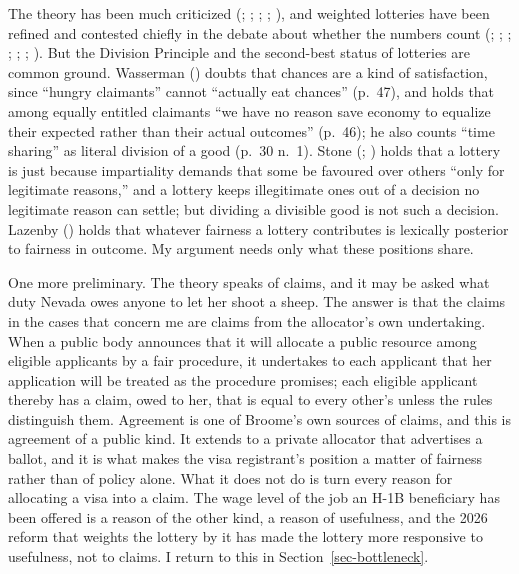 \documentclass[
  11pt,
  letterpaper,
  DIV=11,
  numbers=noendperiod,
  twoside]{scrartcl}
\begin{document}
The theory has been much criticized (; ;
;
;
), and weighted lotteries have
been refined and contested chiefly in the debate about whether the
numbers count (;
;
;
;
; ; ). But the Division Principle and the second-best status of
lotteries are common ground. Wasserman
() doubts that chances are a kind of
satisfaction, since ``hungry claimants'' cannot ``actually eat chances''
(p.~47), and holds that among equally entitled claimants ``we have no
reason save economy to equalize their expected rather than their actual
outcomes'' (p.~46); he also counts ``time sharing'' as literal division
of a good (p.~30 n.~1). Stone (;
) holds that a lottery is just because
impartiality demands that some be favoured over others ``only for
legitimate reasons,'' and a lottery keeps illegitimate ones out of a
decision no legitimate reason can settle; but dividing a divisible good
is not such a decision. Lazenby ()
holds that whatever fairness a lottery contributes is lexically
posterior to fairness in outcome. My argument needs only what these
positions share.

One more preliminary. The theory speaks of claims, and it may be asked
what duty Nevada owes anyone to let her shoot a sheep. The answer is
that the claims in the cases that concern me are claims from the
allocator's own undertaking. When a public body announces that it will
allocate a public resource among eligible applicants by a fair
procedure, it undertakes to each applicant that her application will be
treated as the procedure promises; each eligible applicant thereby has a
claim, owed to her, that is equal to every other's unless the rules
distinguish them. Agreement is one of Broome's own sources of claims,
and this is agreement of a public kind. It extends to a private
allocator that advertises a ballot, and it is what makes the visa
registrant's position a matter of fairness rather than of policy alone.
What it does not do is turn every reason for allocating a visa into a
claim. The wage level of the job an H-1B beneficiary has been offered is
a reason of the other kind, a reason of usefulness, and the 2026 reform
that weights the lottery by it has made the lottery more responsive to
usefulness, not to claims. I return to this in
Section~\ref{sec-bottleneck}.
\end{document}
